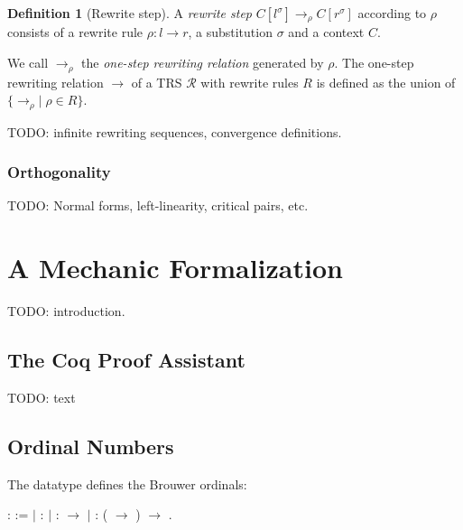 \documentclass[11pt,oneside,a4paper,final]{report}
\theoremstyle{definition}
\newtheorem{definition}{Definition}
\begin{document}
\begin{definition}[Rewrite step]
A \emph{rewrite step} $C[l^\sigma] \rightarrow_\rho C[r^\sigma]$ according to
$\rho$ consists of a rewrite rule $\rho : l \rightarrow r$, a substitution
$\sigma$ and a context $C$.
\end{definition}

We call $\rightarrow_\rho$ the \emph{one-step rewriting relation} generated by
$\rho$. The one-step rewriting relation $\rightarrow$ of a TRS $\mathcal{R}$
with rewrite rules $R$ is defined as the union of $\{ \rightarrow_\rho | \;
\rho \in R \}$.

TODO: infinite rewriting sequences, convergence definitions.


\subsection{Orthogonality}

TODO: Normal forms, left-linearity, critical pairs, etc.


\chapter{A Mechanic Formalization}\label{chap:formalization}

TODO: introduction.


\section{The Coq Proof Assistant}

TODO: text


\section{Ordinal Numbers}

The  datatype defines the Brouwer
ordinals:

\begin{singlespace}
\begin{coqdoccode}
\coqdocnoindent
{}  :
 :=\coqdoceol
\coqdocindent{1.00em}
\ensuremath{|}   :
\coqdoceol
\coqdocindent{1.00em}
\ensuremath{|}   :
 \ensuremath{\rightarrow}
\coqdoceol
\coqdocindent{1.00em}
\ensuremath{|}  :
(
\ensuremath{\rightarrow} )
\ensuremath{\rightarrow}
.\coqdoceol
\end{coqdoccode}
\end{singlespace}
\end{document}
